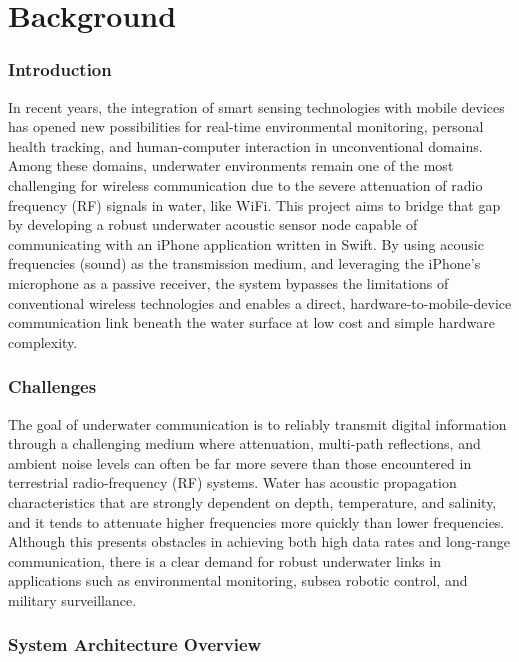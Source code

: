 \chapter{Background}

\subsection{Introduction}

In recent years, the integration of smart sensing technologies with mobile devices has opened new possibilities for real-time environmental monitoring, personal health tracking, and human-computer interaction in unconventional domains. Among these domains, underwater environments remain one of the most challenging for wireless communication due to the severe attenuation of radio frequency (RF) signals in water, like WiFi. This project aims to bridge that gap by developing a robust underwater acoustic sensor node capable of communicating with an iPhone application written in Swift. By using acousic frequencies (sound) as the transmission medium, and leveraging the iPhone's microphone as a passive receiver, the system bypasses the limitations of conventional wireless technologies and enables a direct, hardware-to-mobile-device communication link beneath the water surface at low cost and simple hardware complexity.

\subsection{Challenges}

The goal of underwater communication is to reliably transmit digital information through a challenging medium where attenuation, multi-path reflections, and ambient noise levels can often be far more severe than those encountered in terrestrial radio-frequency (RF) systems. Water has acoustic propagation characteristics that are strongly dependent on depth, temperature, and salinity, and it tends to attenuate higher frequencies more quickly than lower frequencies. Although this presents obstacles in achieving both high data rates and long-range communication, there is a clear demand for robust underwater links in applications such as environmental monitoring, subsea robotic control, and military surveillance.

\subsection{System Architecture Overview}

